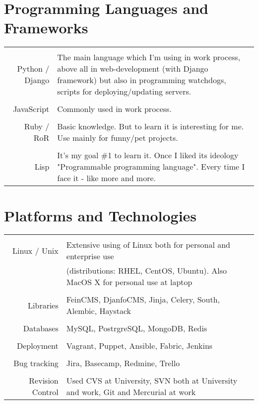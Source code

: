 \documentclass[a4paper,10pt]{article}
\begin{document}
\section{Programming Languages and Frameworks}
 \begin{tabular}{r|p{11cm}}
 \multicolumn{2}{c}{} \\
  Python / Django & The main language which I'm using in work process, above all in web-development (with Django framework) but also in programming watchdogs, scripts for deploying/updating servers.\\
 \multicolumn{2}{c}{} \\
  JavaScript & Commonly used in work process.  \\
 \multicolumn{2}{c}{} \\
  Ruby / RoR & Basic knowledge. But to learn it is interesting for me. Use mainly for funny/pet projects. \\
 \multicolumn{2}{c}{} \\
  Lisp & It's my goal \#1 to learn it. Once I liked its ideology "Programmable programming language". Every time I face it - like more and more. \\
 \end{tabular}

\section{Platforms and Technologies}
 \begin{tabular}{r|p{11cm}}
 \multicolumn{2}{c}{} \\
  Linux / Unix & Extensive using of Linux both for personal and enterprise use \\
  & (distributions: RHEL, CentOS, Ubuntu). Also MacOS X for personal use at laptop \\
 \multicolumn{2}{c}{} \\
  Libraries & FeinCMS, DjanfoCMS, Jinja, Celery, South, Alembic, Haystack \\
 \multicolumn{2}{c}{} \\
  Databases & MySQL, PostrgreSQL, MongoDB, Redis \\
 \multicolumn{2}{c}{} \\
  Deployment & Vagrant, Puppet, Ansible, Fabric, Jenkins \\
 \multicolumn{2}{c}{} \\
  Bug tracking & Jira, Basecamp, Redmine, Trello \\
 \multicolumn{2}{c}{} \\
  Revision Control & Used CVS at University, SVN both at University and work,  Git and Mercurial at work \\
 \end{tabular}
\end{document}
